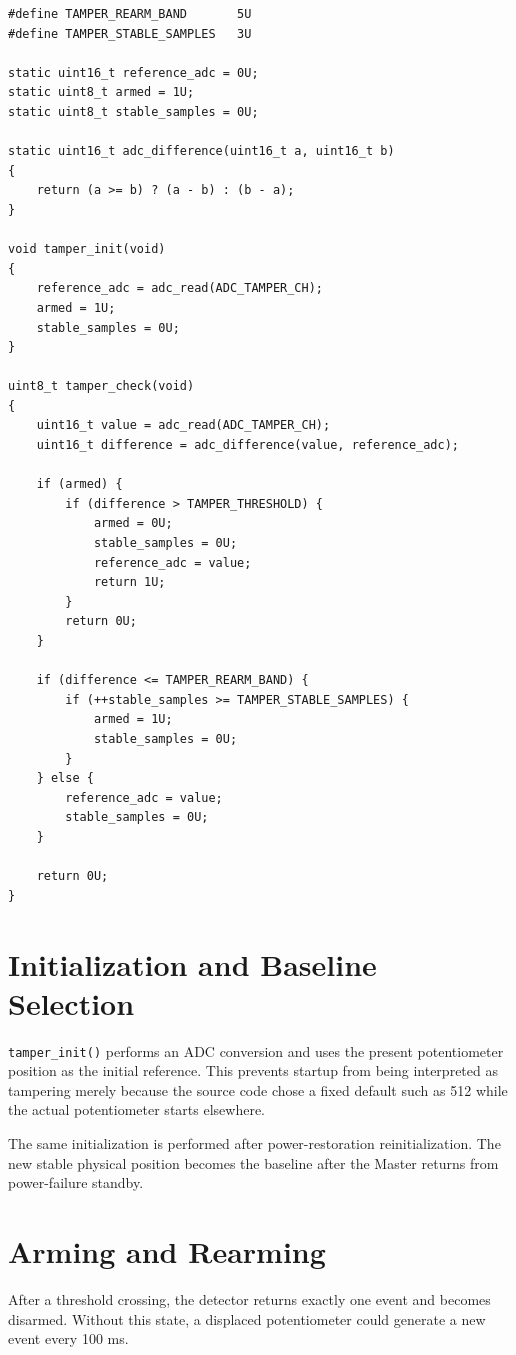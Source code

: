 \documentclass[11pt,a4paper]{article}
\begin{document}
\begin{lstlisting}[style=cstyle,caption={Robust stable-reference tamper detector.}]
#define TAMPER_REARM_BAND       5U
#define TAMPER_STABLE_SAMPLES   3U

static uint16_t reference_adc = 0U;
static uint8_t armed = 1U;
static uint8_t stable_samples = 0U;

static uint16_t adc_difference(uint16_t a, uint16_t b)
{
    return (a >= b) ? (a - b) : (b - a);
}

void tamper_init(void)
{
    reference_adc = adc_read(ADC_TAMPER_CH);
    armed = 1U;
    stable_samples = 0U;
}

uint8_t tamper_check(void)
{
    uint16_t value = adc_read(ADC_TAMPER_CH);
    uint16_t difference = adc_difference(value, reference_adc);

    if (armed) {
        if (difference > TAMPER_THRESHOLD) {
            armed = 0U;
            stable_samples = 0U;
            reference_adc = value;
            return 1U;
        }
        return 0U;
    }

    if (difference <= TAMPER_REARM_BAND) {
        if (++stable_samples >= TAMPER_STABLE_SAMPLES) {
            armed = 1U;
            stable_samples = 0U;
        }
    } else {
        reference_adc = value;
        stable_samples = 0U;
    }

    return 0U;
}
\end{lstlisting}

\section{Initialization and Baseline Selection}
\texttt{tamper\_init()} performs an ADC conversion and uses the present potentiometer position as the initial reference. This prevents startup from being interpreted as tampering merely because the source code chose a fixed default such as 512 while the actual potentiometer starts elsewhere.

The same initialization is performed after power-restoration reinitialization. The new stable physical position becomes the baseline after the Master returns from power-failure standby.

\section{Arming and Rearming}
After a threshold crossing, the detector returns exactly one event and becomes disarmed. Without this state, a displaced potentiometer could generate a new event every 100 ms.
\end{document}
